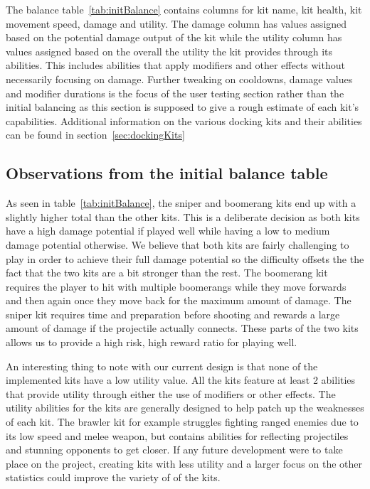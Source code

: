 The balance table~\ref{tab:initBalance} contains columns for kit name, kit health, kit movement speed, damage and utility. The damage column has values assigned based on the potential damage output of the kit while the utility column has values assigned based on the overall the utility the kit provides through its abilities. This includes abilities that apply modifiers and other effects without necessarily focusing on damage. Further tweaking on cooldowns, damage values and modifier durations is the focus of the user testing section rather than the initial balancing as this section is supposed to give a rough estimate of each kit's capabilities. 
Additional information on the various docking kits and their abilities can be found in section~\ref{sec:dockingKits}

\subsection{Observations from the initial balance table}     
As seen in table~\ref{tab:initBalance}, the sniper and boomerang kits end up with a slightly higher total than the other kits. This is a deliberate decision as both kits have a high damage potential if played well while having a low to medium damage potential otherwise. We believe that both kits are fairly challenging to play in order to achieve their full damage potential so the difficulty offsets the the fact that the two kits are a bit stronger than the rest. 
The boomerang kit requires the player to hit with multiple boomerangs while they move forwards and then again once they move back for the maximum amount of damage. The sniper kit requires time and preparation before shooting and rewards a large amount of damage if the projectile actually connects.  
These parts of the two kits allows us to provide a high risk, high reward ratio for playing well.

An interesting thing to note with our current design is that none of the implemented kits have a low utility value. All the kits feature at least 2 abilities that provide utility through either the use of modifiers or other effects. The utility abilities for the kits are generally designed to help patch up the weaknesses of each kit. The brawler kit for example struggles fighting ranged enemies due to its low speed and melee weapon, but contains abilities for reflecting projectiles and stunning opponents to get closer. If any future development were to take place on the project, creating kits with less utility and a larger focus on the other statistics could improve the variety of of the kits.


